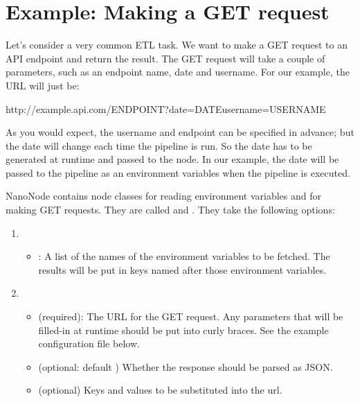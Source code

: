 \documentclass[letterpaper,10pt,english]{sphinxmanual}
\begin{document}
\section{Example: Making a GET request}
\label{\detokenize{data_journey:example-making-a-get-request}}
Let’s consider a very common ETL task. We want to make a GET request to an
API endpoint and return the result. The GET request will take a couple of
parameters, such as an endpoint name, date and username. For our example,
the URL will just be:

%
\begin{sphinxVerbatim}[commandchars=\\\{\}]
http://example.api.com/ENDPOINT?date=DATE\PYGZam{}username=USERNAME
\end{sphinxVerbatim}

As you would expect, the username and endpoint can be specified in advance;
but the date will change each time the pipeline is run. So the date has to
be generated at runtime and passed to the node. In our example, the
date will be passed to the pipeline as an environment variables 
when the pipeline is executed.

NanoNode contains node classes for reading environment variables and for making
GET requests. They are called  and
. They take the following options:
\begin{enumerate}
\def\theenumi{\arabic{enumi}}
\def\labelenumi{\theenumi .}
\makeatletter\def\p@enumii{\p@enumi \theenumi .}\makeatother
\item {} 
\begin{itemize}
\item {} 
: A list of the names of the environment
variables to be fetched. The results will be put in keys named after
those environment variables.

\end{itemize}

\item {} 
\begin{itemize}
\item {} 
 (required): The URL for the GET request. Any parameters that will be filled-in
at runtime should be put into curly braces. See the example configuration
file below.

\item {} 
 (optional: default ) Whether the response should be parsed as JSON.

\item {} 
 (optional) Keys and values to be substituted into the
url.

\end{itemize}

\end{enumerate}
\end{document}
